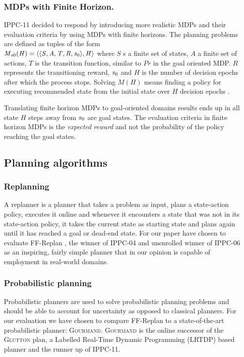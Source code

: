 \documentclass[runningheads,a4paper]{llncs}
\begin{document}
\subsubsection{MDPs with Finite Horizon. }IPPC-11 decided to respond by introducing more realistic MDPs and their evaluation criteria by using MDPs with finite horizons. The planning problems are defined as tuples of the form \\ $\mathit{M\textsubscript{s0}(H) = \langle \langle S, A, T, R, s\textsubscript{0} \rangle , H \rangle }$ where $\mathit{S}$ s a finite set of states, $\mathit{A}$ a finite set of actions, $\mathit{T}$ is the transition function, similar to $\mathit{Pr}$ in the goal oriented MDP. $\mathit{R}$ represents the transitioning reward, $\mathit{s\textsubscript{0}}$ and $\mathit{H}$ is the number of decision epochs after which the process stops. Solving $\mathit{M(H)}$ means finding a policy for executing recommended state from the initial state over $\mathit{H}$ decision epochs \cite{kolobov2012gourmand}.

Translating finite horizon MDPs to goal-oriented domains results ends up in all state $H$ steps away from $s\textsubscript{0}$ are goal states. The evaluation criteria in finite horizon MDPs is the \emph{expected reward} and not the probability of the policy reaching the goal states.

\subsection{Planning algorithms}
\subsubsection{Replanning}
A replanner is a planner that takes a problem as input, plans a state-action policy, executes it online and whenever it encounters a state that was not in its state-action policy, it takes the current state as starting state and plans again until it has reached a goal or dead-end state. For our paper have chosen to evaluate FF-Replan \cite{FFReplan}, the winner of IPPC-04 and unenrolled winner of IPPC-06 as an inspiring, fairly simple planner that in our opinion is capable of employment in real-world domains.

\subsubsection{Probabilistic planning}
Probabilistic planners are used to solve probabilistic planning problems and should be able to account for uncertainty as opposed to classical planners. For our evaluation we have chosen to compare FF-Replan to a state-of-the-art probabilistic planner: \textsc{Gourmand}. \textsc{Gourmand} is the online successor of the \textsc{Glutton} plan, a Labelled Real-Time Dynamic Programming (LRTDP) based planner and the runner up of IPPC-11.
\end{document}
